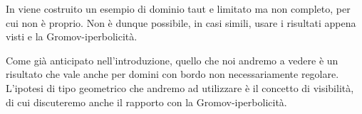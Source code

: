 \begin{ex}
    In \cite{Rosay} viene costruito un esempio di dominio taut e limitato ma non completo, per cui non è proprio. Non è dunque possibile, in casi simili, usare i risultati appena visti e la Gromov-iperbolicità.
\end{ex}

Come già anticipato nell'introduzione, quello che noi andremo a vedere è un risultato che vale anche per domini con bordo non necessariamente regolare. L'ipotesi di tipo geometrico che andremo ad utilizzare è il concetto di visibilità, di cui discuteremo anche il rapporto con la Gromov-iperbolicità.